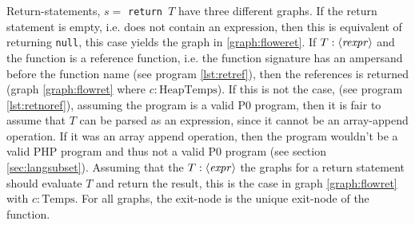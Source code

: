 \begin{graph}
{\begin{adjustbox}{max size={.25\textwidth}{.25\textheight}}
\end{adjustbox}}\hfill%
\hspace*{\fill}
\end{graph}

Return-statements, $s =$ \texttt{return $T$} have three different graphs. If the return statement is empty, i.e. does not contain an expression, then this is equivalent of returning \texttt{null}, this case yields the graph in \ref{graph:floweret}. If $T : \langle\mathit{rexpr}\rangle$ and the function is a reference function, i.e. the function signature has an ampersand before the function name (see program \ref{lst:retref}), then the references is returned (graph \ref{graph:flowret} where $c : \text{HeapTemps}$). If this is not the case, (see program \ref{lst:retnoref}), assuming the program is a valid P0 program, then it is fair to assume that $T$ can be parsed as an expression, since it cannot be an array-append operation. If it was an array append operation, then the program wouldn't be a valid PHP program and thus not a valid P0 program (see section \ref{sec:langsubset}). Assuming that the $T : \langle\mathit{expr}\rangle$ the graphs for a return statement should evaluate $T$ and return the result, this is the case in graph \ref{graph:flowret} with $c : \text{Temps}$.  For all graphs, the exit-node is the unique exit-node of the function.

